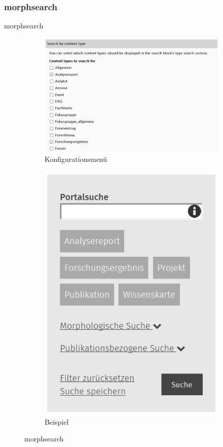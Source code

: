 \subsubsection{morphsearch}\label{subsub:morphsearch}
morphsearch
\begin{figure}[H]
	\centering
	\begin{subfigure}[a]{0.4\textwidth}
		\centering
		\includegraphics[height=0.20\textheight]{images/config_morphsearch}
		\caption[]{Konfigurationsmenü}
		\label{fig:config_morphsearch}
	\end{subfigure}
	\begin{subfigure}[A]{0.4\textwidth}
		\centering
		\includegraphics[height=0.20\textheight]{images/example_morphsearch}
		\caption[]{Beispiel}
		\label{fig:example_morphsearch}
	\end{subfigure}
	\caption[]{morphsearch}
	\label{fig:morphsearch}
\end{figure}



